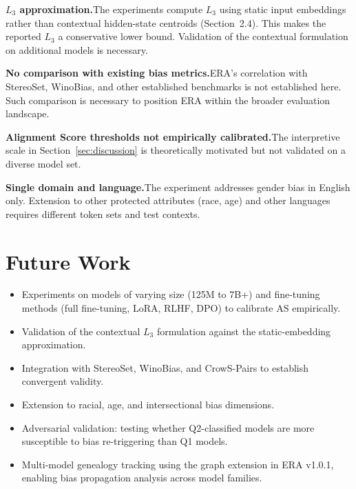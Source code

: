 \documentclass[11pt,a4paper]{article}
\newcommand{\AS}{\mathrm{AS}}
\begin{document}
\textbf{$L_3$ approximation.}\enspace The experiments compute $L_3$ using static input
embeddings rather than contextual hidden-state centroids (Section~2.4). This makes the
reported $L_3$ a conservative lower bound. Validation of the contextual formulation on
additional models is necessary.

\textbf{No comparison with existing bias metrics.}\enspace ERA's correlation with
StereoSet, WinoBias, and other established benchmarks is not established here. Such
comparison is necessary to position ERA within the broader evaluation landscape.

\textbf{Alignment Score thresholds not empirically calibrated.}\enspace The interpretive
scale in Section~\ref{sec:discussion} is theoretically motivated but not validated on
a diverse model set.

\textbf{Single domain and language.}\enspace The experiment addresses gender bias in
English only. Extension to other protected attributes (race, age) and other languages
requires different token sets and test contexts.

\section{Future Work}

\begin{itemize}[leftmargin=1.4em, itemsep=3pt]
  \item Experiments on models of varying size (125M to 7B+) and fine-tuning methods
    (full fine-tuning, LoRA, RLHF, DPO) to calibrate $\AS$ empirically.
  \item Validation of the contextual $L_3$ formulation against the static-embedding
    approximation.
  \item Integration with StereoSet, WinoBias, and CrowS-Pairs to establish convergent
    validity.
  \item Extension to racial, age, and intersectional bias dimensions.
  \item Adversarial validation: testing whether Q2-classified models are more susceptible
    to bias re-triggering than Q1 models.
  \item Multi-model genealogy tracking using the graph extension in ERA v1.0.1, enabling
    bias propagation analysis across model families.
\end{itemize}

\end{document}
